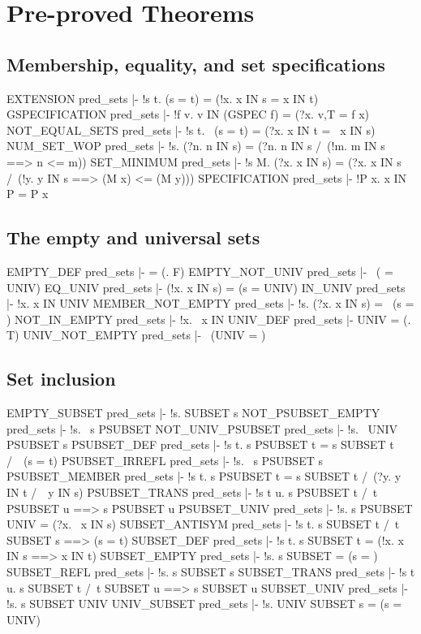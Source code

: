 \chapter{Pre-proved Theorems}

\section{Membership, equality, and set specifications}
\THEOREM EXTENSION pred\_sets
|- !s t. (s = t) = (!x. x IN s = x IN t)
\ENDTHEOREM
\THEOREM GSPECIFICATION pred\_sets
|- !f v. v IN (GSPEC f) = (?x. v,T = f x)
\ENDTHEOREM
\THEOREM NOT\_EQUAL\_SETS pred\_sets
|- !s t. ~(s = t) = (?x. x IN t = ~x IN s)
\ENDTHEOREM
\THEOREM NUM\_SET\_WOP pred\_sets
|- !s. (?n. n IN s) = (?n. n IN s /\ (!m. m IN s ==> n <= m))
\ENDTHEOREM
\THEOREM SET\_MINIMUM pred\_sets
|- !s M. (?x. x IN s) = (?x. x IN s /\ (!y. y IN s ==> (M x) <= (M y)))
\THEOREM SPECIFICATION pred\_sets
|- !P x. x IN P = P x
\ENDTHEOREM
\section{The empty and universal sets}
\THEOREM EMPTY\_DEF pred\_sets
|- {} = (\x. F)
\ENDTHEOREM
\THEOREM EMPTY\_NOT\_UNIV pred\_sets
|- ~({} = UNIV)
\ENDTHEOREM
\THEOREM EQ\_UNIV pred\_sets
|- (!x. x IN s) = (s = UNIV)
\ENDTHEOREM
\THEOREM IN\_UNIV pred\_sets
|- !x. x IN UNIV
\ENDTHEOREM
\THEOREM MEMBER\_NOT\_EMPTY pred\_sets
|- !s. (?x. x IN s) = ~(s = {})
\ENDTHEOREM
\THEOREM NOT\_IN\_EMPTY pred\_sets
|- !x. ~x IN {}
\ENDTHEOREM
\THEOREM UNIV\_DEF pred\_sets
|- UNIV = (\x. T)
\ENDTHEOREM
\THEOREM UNIV\_NOT\_EMPTY pred\_sets
|- ~(UNIV = {})
\ENDTHEOREM
\section{Set inclusion}
\THEOREM EMPTY\_SUBSET pred\_sets
|- !s. {} SUBSET s
\ENDTHEOREM
\THEOREM NOT\_PSUBSET\_EMPTY pred\_sets
|- !s. ~s PSUBSET {}
\ENDTHEOREM
\THEOREM NOT\_UNIV\_PSUBSET pred\_sets
|- !s. ~UNIV PSUBSET s
\ENDTHEOREM
\THEOREM PSUBSET\_DEF pred\_sets
|- !s t. s PSUBSET t = s SUBSET t /\ ~(s = t)
\ENDTHEOREM
\THEOREM PSUBSET\_IRREFL pred\_sets
|- !s. ~s PSUBSET s
\ENDTHEOREM
\THEOREM PSUBSET\_MEMBER pred\_sets
|- !s t. s PSUBSET t = s SUBSET t /\ (?y. y IN t /\ ~y IN s)
\ENDTHEOREM
\THEOREM PSUBSET\_TRANS pred\_sets
|- !s t u. s PSUBSET t /\ t PSUBSET u ==> s PSUBSET u
\ENDTHEOREM
\THEOREM PSUBSET\_UNIV pred\_sets
|- !s. s PSUBSET UNIV = (?x. ~x IN s)
\ENDTHEOREM
\THEOREM SUBSET\_ANTISYM pred\_sets
|- !s t. s SUBSET t /\ t SUBSET s ==> (s = t)
\ENDTHEOREM
\THEOREM SUBSET\_DEF pred\_sets
|- !s t. s SUBSET t = (!x. x IN s ==> x IN t)
\ENDTHEOREM
\THEOREM SUBSET\_EMPTY pred\_sets
|- !s. s SUBSET {} = (s = {})
\ENDTHEOREM
\THEOREM SUBSET\_REFL pred\_sets
|- !s. s SUBSET s
\ENDTHEOREM
\THEOREM SUBSET\_TRANS pred\_sets
|- !s t u. s SUBSET t /\ t SUBSET u ==> s SUBSET u
\ENDTHEOREM
\THEOREM SUBSET\_UNIV pred\_sets
|- !s. s SUBSET UNIV
\ENDTHEOREM
\THEOREM UNIV\_SUBSET pred\_sets
|- !s. UNIV SUBSET s = (s = UNIV)
\ENDTHEOREM
